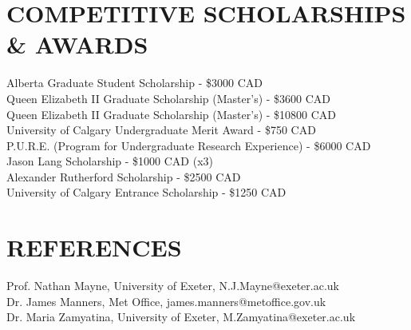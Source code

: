 \documentclass[letter, margin, 10pt]{res} %
\begin{document}
\begin{resume}
\section{COMPETITIVE SCHOLARSHIPS \& AWARDS}
\vspace{4pt}
Alberta Graduate Student Scholarship - \$3000 CAD\hfill{}\\
Queen Elizabeth II Graduate Scholarship (Master's) - \$3600 CAD\hfill{}\\
Queen Elizabeth II Graduate Scholarship (Master's) - \$10800 CAD\hfill{}\\
University of Calgary Undergraduate Merit Award - \$750 CAD\hfill{}\\
P.U.R.E. (Program for Undergraduate Research Experience) - \$6000 CAD\hfill{}\\
Jason Lang Scholarship - \$1000 CAD (x3)\hfill{}\\
Alexander Rutherford Scholarship - \$2500 CAD\hfill{}\\
University of Calgary Entrance Scholarship - \$1250 CAD\hfill{}



 

 \section{REFERENCES} 

Prof. Nathan Mayne, University of Exeter, N.J.Mayne@exeter.ac.uk \\
Dr. James Manners, Met Office, james.manners@metoffice.gov.uk \\
Dr. Maria Zamyatina, University of Exeter, M.Zamyatina@exeter.ac.uk
 

\end{resume}
\end{document}
